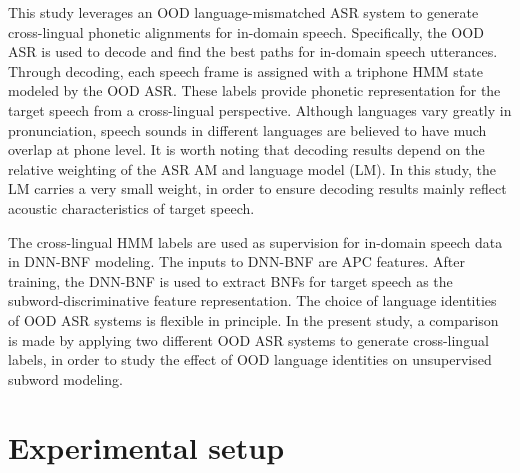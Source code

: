 \documentclass[a4paper]{article}
\begin{document}
This study leverages an OOD language-mismatched ASR system to generate cross-lingual phonetic alignments for in-domain speech.
Specifically, the OOD ASR is used to decode  and find the best paths for   in-domain speech utterances. Through decoding, each speech frame is assigned with a triphone HMM state modeled by the OOD ASR. These labels provide phonetic representation for the target speech from a cross-lingual perspective. Although languages vary greatly in pronunciation, speech sounds in different languages are believed to have much overlap at phone level.
It is worth noting that decoding results depend on the relative weighting  of the ASR AM and language model (LM). In this study, the LM carries a very small weight, in order to ensure decoding results mainly reflect acoustic characteristics of target speech.

The cross-lingual HMM labels are used as supervision for in-domain speech data in DNN-BNF modeling.
The inputs to DNN-BNF are APC features. 
After training, the DNN-BNF is used to extract BNFs for target speech as the subword-discriminative feature representation. 
The choice of language identities of OOD ASR systems is flexible in principle. In the present study, a comparison is made by applying two different OOD ASR systems to generate cross-lingual labels, in order to study the effect  of OOD  language identities on unsupervised subword modeling.


\section{Experimental setup}
\end{document}
